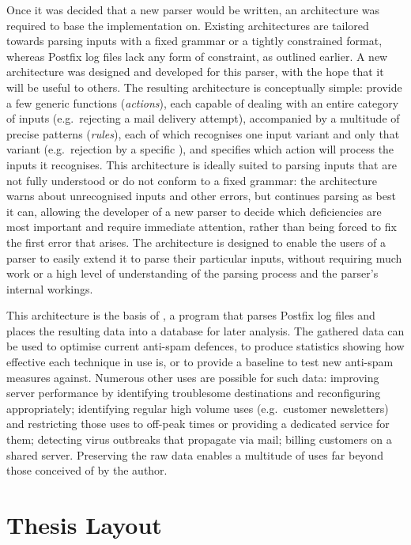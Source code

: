 Once it was decided that a new parser would be written, an architecture was
required to base the implementation on.  Existing architectures are
tailored towards parsing inputs with a fixed grammar or a tightly
constrained format, whereas Postfix log files lack any form of constraint,
as outlined earlier.  A new architecture was designed and developed for
this parser, with the hope that it will be useful to others.  The resulting
architecture is conceptually simple: provide a few generic functions
(\textit{actions\/}), each capable of dealing with an entire category of
inputs (e.g.\ rejecting a mail delivery attempt), accompanied by a
multitude of precise patterns (\textit{rules\/}), each of which recognises
one input variant and only that variant (e.g.\ rejection by a specific
), and specifies which action will process the inputs it
recognises.  This architecture is ideally suited to parsing inputs that are
not fully understood or do not conform to a fixed grammar: the architecture
warns about unrecognised inputs and other errors, but continues parsing as
best it can, allowing the developer of a new parser to decide which
deficiencies are most important and require immediate attention, rather
than being forced to fix the first error that arises.
The architecture is designed to enable the users of a parser to
easily extend it to parse their particular inputs, without requiring much
work or a high level of understanding of the parsing process and the
parser's internal workings.

This architecture is the basis of \parsername{}, a program that parses
Postfix log files and places the resulting data into a 
database for later analysis.  The gathered data can be used to optimise
current anti-spam defences, to produce statistics showing how effective
each technique in use is, or to provide a baseline to test new anti-spam
measures against.  Numerous other uses are possible for such data:
improving server performance by identifying troublesome destinations and
reconfiguring appropriately; identifying regular high volume uses (e.g.\
customer newsletters) and restricting those uses to off-peak times or
providing a dedicated service for them; detecting virus outbreaks that
propagate via mail; billing customers on a shared server.  Preserving the
raw data enables a multitude of uses far beyond those conceived of by the
author.

\section{Thesis Layout}


